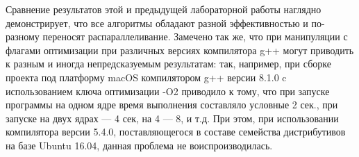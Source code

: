 \documentclass[13pt]{article}
\begin{document}
	Сравнение результатов этой и предыдущей лабораторной работы наглядно демонстрирует, что все алгоритмы обладают разной эффективностью и по-разному переносят распараллеливание. Замечено так же, что при манипуляции с флагами оптимизации при различных версиях компилятора g++ могут приводить к разным и иногда непредсказуемым результатам: так, например, при сборке проекта под платформу macOS компилятором g++ версии 8.1.0 c использованием ключа оптимизации -O2 приводило к тому, что при запуске программы на одном ядре время выполнения составляло условные 2 сек., при запуске на двух ядрах — 4 сек, на 4 — 8, и т.д. При этом, при использовании компилятора версии 5.4.0, поставляющегося в составе семейства дистрибутивов на базе Ubuntu 16.04, данная проблема не воиспроизводилась.
\end{document}
